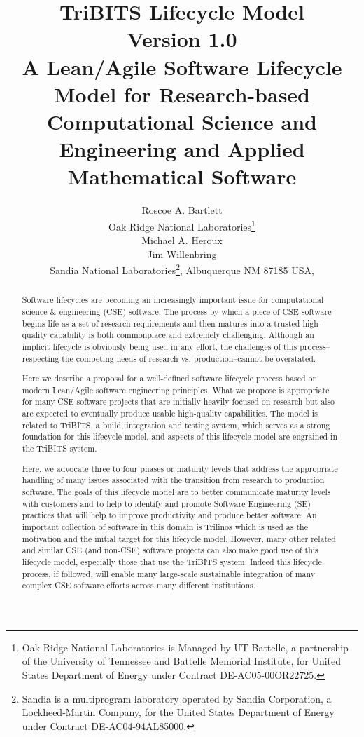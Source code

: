 \documentclass[11pt]{SANDreport}
\title{\center
TriBITS Lifecycle Model \\[2ex] Version 1.0 \\[2ex] \large A
Lean/Agile Software Lifecycle Model for Research-based Computational
Science and Engineering and Applied Mathematical Software }
\author{
Roscoe A. Bartlett \\ Oak Ridge National Laboratories\footnote{Oak
Ridge National Laboratories is Managed by UT-Battelle, a partnership
of the University of Tennessee and Battelle Memorial Institute, for
United States Department of Energy under Contract DE-AC05-00OR22725.} 
\\[2ex] Michael A. Heroux \\ Jim Willenbring \\ Sandia
National Laboratories\footnote{Sandia is a multiprogram laboratory
operated by Sandia Corporation, a Lockheed-Martin Company, for the
United States Department of Energy under Contract DE-AC04-94AL85000.},
Albuquerque NM 87185 USA, \\ }
\date{}
\begin{document}

\maketitle

%

%
\begin{abstract}
%

Software lifecycles are becoming an increasingly important issue for
computational science \& engineering (CSE) software.  The process 
by which a piece of CSE software begins life as a set of research requirements
and then matures into a trusted
high-quality capability is both commonplace and extremely challenging.  Although
an implicit lifecycle is obviously being used in any effort, the challenges of this 
process--respecting the competing needs of research vs. production--cannot
be overstated.

Here we describe a proposal for a well-defined software lifecycle
process based on modern Lean/Agile software engineering principles.
What we propose is appropriate for many CSE software projects that are initially
heavily focused on research but also are expected to eventually
produce usable high-quality capabilities.  The model is related to 
 TriBITS, a build, integration and testing system, which serves as a
strong foundation for this lifecycle model, and aspects of this
lifecycle model are engrained in the TriBITS system.  

Here, we advocate three to four phases or maturity levels  that address the
appropriate handling of many issues associated with the
transition from research to production software.  The goals of this lifecycle
model are to better communicate maturity levels with customers and to
help to identify and promote Software Engineering (SE) practices that will help to improve
productivity and produce better software.  An important collection of
software in this domain is Trilinos which is used as the motivation
and the initial target for this lifecycle model.  However, many other
related and similar CSE (and non-CSE) software projects can also
make good use of this lifecycle model, especially those that use the
TriBITS system.  Indeed this lifecycle process, if followed, will
enable many  large-scale sustainable integration of many
complex CSE software efforts across many different institutions.

%
\end{abstract}
%
\end{document}
